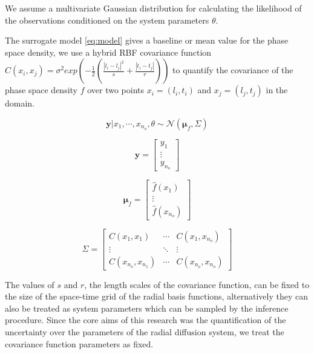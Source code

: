 We assume a multivariate Gaussian distribution for calculating the likelihood of 
the observations conditioned on the system parameters $\theta$. 

The surrogate model \ref{eq:model} gives a baseline or mean value for the phase space density, we use a
hybrid RBF covariance function $C(x_{i}, x_{j}) = \sigma^2 exp(-\frac{1}{2} (\frac{|l_i - l_j|^2}{s} + \frac{|t_i - t_j|}{r}))$
to quantify the covariance of the phase space density $f$ over two points 
$x_i = (l_i, t_i)$ and $x_j = (l_j, t_j)$ in the domain. 

\begin{equation}
\mathbf{y} | x_1, \cdots, x_{n_o}, \theta \sim \mathcal{N} \left(\mathbf{\mu}_f, \Sigma \right )
\end{equation}

\begin{equation}
\mathbf{y} = \begin{bmatrix}
y_1\\ 
\vdots\\ 
y_{n_o}
\end{bmatrix}
\end{equation}

\begin{equation}
  \mathbf{\mu}_f = \begin{bmatrix}
\hat{f}(x_1)\\ 
\vdots\\ 
\hat{f}(x_{n_o})
\end{bmatrix}
\end{equation}

\begin{equation}
    \Sigma = \begin{bmatrix}
C(x_1, x_1) & \cdots  & C(x_1, x_{n_o})\\ 
\vdots & \ddots & \vdots\\ 
C(x_{n_o}, x_{n_{1}}) & \cdots  & C(x_{n_o}, x_{n_{o}})
\end{bmatrix}
\end{equation}

The values of $s$ and $r$, the length scales of the covariance function, 
can be fixed to the size of the space-time grid of the radial basis functions, 
alternatively they can also be treated as system parameters which can be sampled 
by the inference procedure. Since the core aims of this research was the quantification
of the uncertainty over the parameters of the radial diffusion system, 
we treat the covariance function parameters as fixed.

